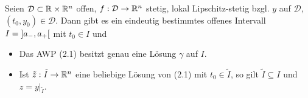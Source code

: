 \documentclass{cheat-sheet}
\newcommand{\D}{\mathcal{D}}
\begin{document}
\begin{satz}
  Seien $\D \subset \R \times \R^n$ offen, $f : \D \to \R^n$ stetig, lokal Lipschitz-stetig bzgl. $y$ auf $\D$, $(t_0, y_0) \in \D$. Dann gibt es ein eindeutig bestimmtes offenes Intervall $I = \left] a_-, a_+ \right[$ mit $t_0 {\in} I$ und
  \begin{itemize}
    \item Das AWP (2.1) besitzt genau eine Lösung $\gamma$ auf $I$.
    \item Ist $\tilde{z} : \tilde{I} \to \mathbb{R}^n$ eine beliebige Lösung von (2.1) mit $t_0 \in \tilde{I}$, so gilt $\tilde{I} \subseteq I$ und $z = y|_{\tilde{I}}$.
  \end{itemize}
\end{satz}
\end{document}
